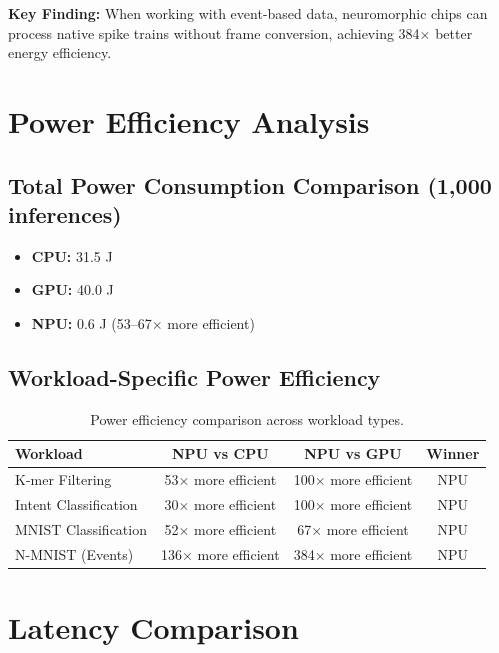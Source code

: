\documentclass[11pt,a4paper]{article}
\begin{document}
\textbf{Key Finding:} When working with event-based data, neuromorphic chips can process native spike trains without frame conversion, achieving 384$\times$ better energy efficiency.

\section{Power Efficiency Analysis}

\subsection{Total Power Consumption Comparison (1,000 inferences)}

\begin{itemize}[leftmargin=*]
    \item \textbf{CPU:} 31.5 J
    \item \textbf{GPU:} 40.0 J
    \item \textbf{NPU:} 0.6 J (53--67$\times$ more efficient)
\end{itemize}

\subsection{Workload-Specific Power Efficiency}

\begin{table}[h]
\centering
\begin{tabular}{@{}lccc@{}}
\toprule
\textbf{Workload} & \textbf{NPU vs CPU} & \textbf{NPU vs GPU} & \textbf{Winner} \\
\midrule
K-mer Filtering & 53$\times$ more efficient & 100$\times$ more efficient & NPU \\
Intent Classification & 30$\times$ more efficient & 100$\times$ more efficient & NPU \\
MNIST Classification & 52$\times$ more efficient & 67$\times$ more efficient & NPU \\
N-MNIST (Events) & 136$\times$ more efficient & 384$\times$ more efficient & NPU \\
\bottomrule
\end{tabular}
\caption{Power efficiency comparison across workload types.}
\end{table}

\section{Latency Comparison}
\end{document}
